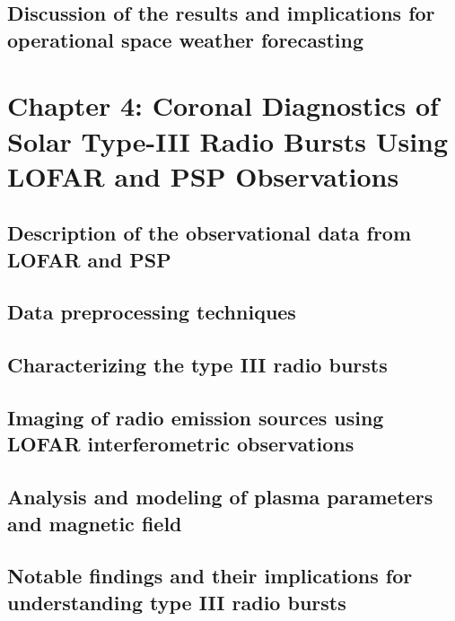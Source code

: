 \documentclass{article}
\begin{document}
\subsection{Discussion of the results and implications for operational space weather forecasting}

\section{Chapter 4: Coronal Diagnostics of Solar Type-III Radio Bursts Using LOFAR and PSP Observations}
\subsection{Description of the observational data from LOFAR and PSP}
\subsection{Data preprocessing techniques}
\subsection{Characterizing the type III radio bursts}
\subsection{Imaging of radio emission sources using LOFAR interferometric observations}
\subsection{Analysis and modeling of plasma parameters and magnetic field}
\subsection{Notable findings and their implications for understanding type III radio bursts}

\end{document}
